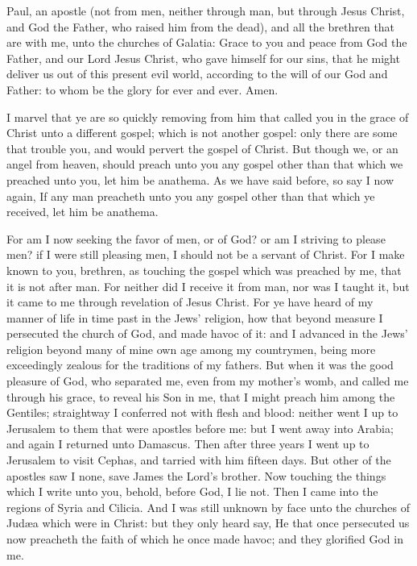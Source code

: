 




Paul, an apostle (not from men, neither through man, but through Jesus Christ, and God the Father, who raised him from the dead), and all the brethren that are with me, unto the churches of Galatia: Grace to you and peace from God the Father, and our Lord Jesus Christ, who gave himself for our sins, that he might deliver us out of this present evil world, according to the will of our God and Father: to whom be the glory for ever and ever. Amen.  

I marvel that ye are so quickly removing from him that called you in the grace of Christ unto a different gospel; which is not another gospel: only there are some that trouble you, and would pervert the gospel of Christ. But though we, or an angel from heaven, should preach unto you any gospel other than that which we preached unto you, let him be anathema. As we have said before, so say I now again, If any man preacheth unto you any gospel other than that which ye received, let him be anathema. 

For am I now seeking the favor of men, or of God? or am I striving to please men? if I were still pleasing men, I should not be a servant of Christ.  For I make known to you, brethren, as touching the gospel which was preached by me, that it is not after man. For neither did I receive it from man, nor was I taught it, but it came to me through revelation of Jesus Christ. For ye have heard of my manner of life in time past in the Jews’ religion, how that beyond measure I persecuted the church of God, and made havoc of it: and I advanced in the Jews’ religion beyond many of mine own age among my countrymen, being more exceedingly zealous for the traditions of my fathers. But when it was the good pleasure of God, who separated me, even from my mother’s womb, and called me through his grace, to reveal his Son in me, that I might preach him among the Gentiles; straightway I conferred not with flesh and blood: neither went I up to Jerusalem to them that were apostles before me: but I went away into Arabia; and again I returned unto Damascus.  Then after three years I went up to Jerusalem to visit Cephas, and tarried with him fifteen days. But other of the apostles saw I none, save James the Lord’s brother. Now touching the things which I write unto you, behold, before God, I lie not. Then I came into the regions of Syria and Cilicia. And I was still unknown by face unto the churches of Judæa which were in Christ: but they only heard say, He that once persecuted us now preacheth the faith of which he once made havoc; and they glorified God in me. 

